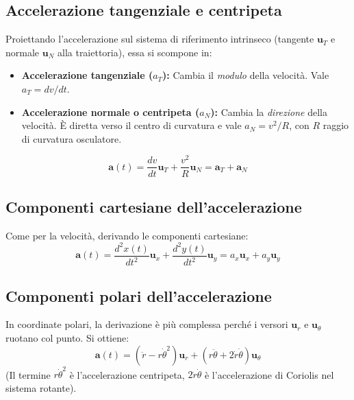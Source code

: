 \documentclass[12pt]{article}
\begin{document}
\subsection*{Accelerazione tangenziale e centripeta}
Proiettando l'accelerazione sul sistema di riferimento intrinseco (tangente $\mathbf{u}_T$ e normale $\mathbf{u}_N$ alla traiettoria), essa si scompone in:
\begin{itemize}
    \item \textbf{Accelerazione tangenziale ($a_T$):} Cambia il \textit{modulo} della velocità. Vale $a_T = dv/dt$.
    \item \textbf{Accelerazione normale o centripeta ($a_N$):} Cambia la \textit{direzione} della velocità. È diretta verso il centro di curvatura e vale $a_N = v^2/R$, con $R$ raggio di curvatura osculatore.
\end{itemize}
\begin{equation}
\mathbf{a}(t) = \frac{dv}{dt}\mathbf{u}_T + \frac{v^2}{R}\mathbf{u}_N = \mathbf{a}_T + \mathbf{a}_N
\end{equation}

\vspace{0.3cm}
\begin{center}
\end{center}
\vspace{0.3cm}

\subsection*{Componenti cartesiane dell'accelerazione}
Come per la velocità, derivando le componenti cartesiane:
\begin{equation}
\mathbf{a}(t) = \frac{d^2x(t)}{dt^2}\mathbf{u}_x + \frac{d^2y(t)}{dt^2}\mathbf{u}_y = a_x\mathbf{u}_x + a_y\mathbf{u}_y
\end{equation}

\subsection*{Componenti polari dell'accelerazione}
In coordinate polari, la derivazione è più complessa perché i versori $\mathbf{u}_r$ e $\mathbf{u}_\theta$ ruotano col punto. Si ottiene:
\begin{equation}
\mathbf{a}(t) = (\ddot{r} - r\dot{\theta}^2)\mathbf{u}_r + (r\ddot{\theta} + 2\dot{r}\dot{\theta})\mathbf{u}_\theta
\end{equation}
(Il termine $r\dot{\theta}^2$ è l'accelerazione centripeta, $2\dot{r}\dot{\theta}$ è l'accelerazione di Coriolis nel sistema rotante).
\end{document}
